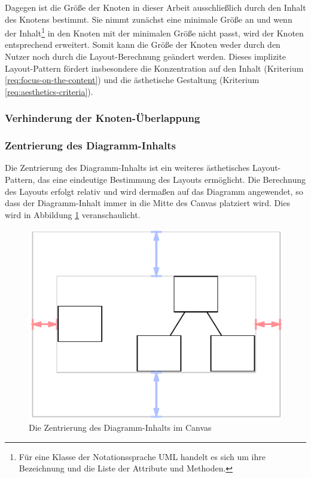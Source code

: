 Dagegen ist die Größe der Knoten in dieser Arbeit ausschließlich durch den Inhalt des Knotens bestimmt. Sie nimmt zunächst eine minimale Größe an und wenn der Inhalt\footnote{Für eine Klasse der Notationssprache UML handelt es sich um ihre Bezeichnung und die Liste der Attribute und Methoden.} in den Knoten mit der minimalen Größe nicht passt, wird der Knoten entsprechend erweitert. Somit kann die Größe der Knoten weder durch den Nutzer noch durch die Layout-Berechnung geändert werden. Dieses implizite Layout-Pattern fördert insbesondere die Konzentration auf den Inhalt (Kriterium \ref{req:focus-on-the-content}) und die ästhetische Gestaltung (Kriterium \ref{req:aesthetics-criteria}).

\subsubsection{Verhinderung der Knoten-Überlappung}


\subsubsection{Zentrierung des Diagramm-Inhalts}
\label{subsubsec:centering-of-diagram-content}

Die Zentrierung des Diagramm-Inhalts ist ein weiteres ästhetisches Layout-Pattern, das eine eindeutige Bestimmung des Layouts ermöglicht. Die Berechnung des Layouts erfolgt relativ und wird dermaßen auf das Diagramm angewendet, so dass der Diagramm-Inhalt immer in die Mitte des Canvas platziert wird. Dies wird in Abbildung \ref{fig:layout-pattern-centered-content} veranschaulicht.

\begin{figure}[hbt]
    \centering
    \includegraphics{resources/layout-pattern-centered-content}
    \caption{Die Zentrierung des Diagramm-Inhalts im Canvas}
    \label{fig:layout-pattern-centered-content}
\end{figure}

